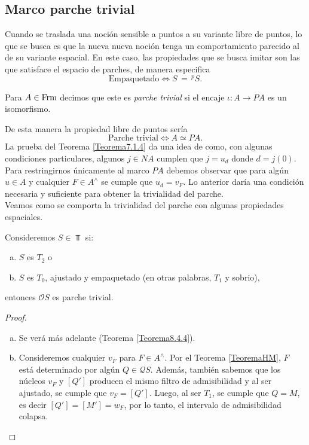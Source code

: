\subsection{Marco parche trivial}
Cuando se traslada una noción sensible a puntos a su variante libre de puntos, lo que se busca es que la nueva nueva 
noción tenga un comportamiento parecido al de su variante espacial. En este caso, las propiedades que se busca imitar son las que 
satisface el espacio de parches, de manera especifica 
\[
\mbox{Empaquetado} \Leftrightarrow S\,=\,^pS.
\]

\begin{dfn}\label{Parche trivial}
    Para $A\in \mathrm{Frm}$ decimos que este es \emph{parche trivial} si el encaje $\iota\colon A\to PA$ es un isomorfismo.
\end{dfn}
De esta manera la propiedad libre de puntos sería 
\[
\mbox{Parche trivial}\Leftrightarrow A\simeq PA.
\]
La prueba del Teorema \ref{Teorema7.1.4} da una idea de como, con algunas condiciones particulares, algunos $j\in NA$ cumplen que $j=u_d$ donde $d=j(0)$. 
Para restringirnos únicamente al marco $PA$ debemos observar que para algún $u\in A$ y cualquier $F\in A^\wedge$ se cumple que $u_d=v_F$. Lo anterior daría 
una condición necesaria y suficiente para obtener la trivialidad del parche.\\

Veamos como se comporta la trivialidad del parche con algunas propiedades espaciales.
\begin{lem}\label{Lema8.1.4}
    Consideremos $S\in \Top$ si:
    \begin{enumerate}[a)]
        \item $S$ es $T_2$ o
        \item $S$ es $T_0$, ajustado y empaquetado (en otras palabras, $T_1$ y sobrio),
    \end{enumerate}
    entonces $\mathcal{O}S$ es parche trivial.
\end{lem}

\begin{proof}
    \begin{enumerate}[a)]
        \item Se verá más adelante (Teorema \ref{Teorema8.4.4}).
        \item Consideremos cualquier $v_F$ para $F\in A^\wedge$. Por el Teorema \ref{TeoremaHM}, $F$ está determinado por algún $Q\in \mathcal{Q}S$. Además, también sabemos que los núcleos $v_F$ y $[Q']$ producen el mismo filtro de admisibilidad y al ser ajustado, se cumple que $v_F=[Q']$. Luego, al ser $T_1$, se cumple que $Q=M$, es decir $[Q']=[M']=w_F$, por lo tanto, el intervalo de admisibilidad colapsa.
    \end{enumerate}
\end{proof}

